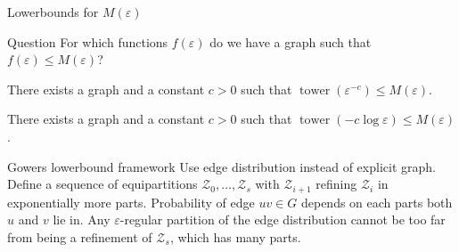 \documentclass{beamer}
\DeclareMathOperator{\twr}{\mathrm{tower}}
\newcommand{\1}{\mathbbm{1}}
\newcommand{\Z}{\mathcal{Z}}
\newcommand{\eps}{\varepsilon}
\begin{document}
\begin{frame}{Lowerbounds for $M(\eps)$}
  \begin{block}{Question}
    For which functions $f(\eps)$ do we have a graph such that $f(\eps) \le M(\eps)$?
  \end{block}

  \pause
  \begin{theorem}[Gowers (1997)]
    There exists a graph and a constant $c > 0$ such that $\twr(\eps^{-c}) \le M(\eps)$.
  \end{theorem}

  \pause

  \begin{corollary}[Gowers (1997)]
    There exists a graph and a constant $c > 0$ such that $\twr(-c\log \eps) \le
      M(\eps)$.
  \end{corollary}
\end{frame}







\begin{frame}{Gowers lowerbound framework}
  Use edge distribution instead of explicit graph.
  \pause
  Define a sequence of equipartitions $\Z_0, \dots, \Z_s$ with $\Z_{i + 1}$ refining
  $\Z_i$ in exponentially more parts.
  \pause
  Probability of edge $uv \in G$ depends on each parts both $u$ and $v$ lie in.
  \pause
  Any $\eps$-regular partition of the edge distribution cannot be too far from being a
  refinement of $\Z_s$, which has many parts.
\end{frame}
\end{document}
